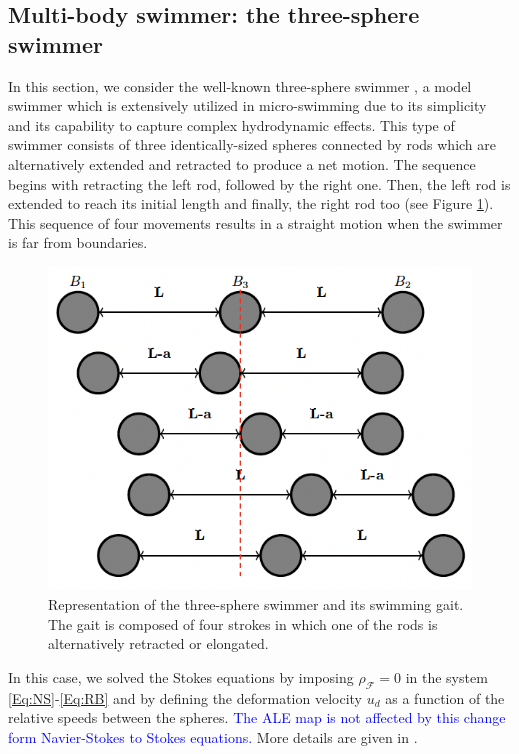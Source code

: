\documentclass[graybox]{svmult}
\newcommand{\review}[1]{\textcolor{blue}{#1}}
\newcommand{\Fluid}{\mathcal{F}} %
\begin{document}
\subsection{Multi-body swimmer: the three-sphere swimmer}

In this section, we consider the well-known three-sphere swimmer \cite{najafi_simplest_2004}, a model swimmer which is extensively utilized in micro-swimming due to its simplicity and its capability to capture complex hydrodynamic effects.
This type of swimmer consists of three identically-sized spheres connected by rods which are alternatively extended and retracted to produce a net motion. The sequence begins with retracting the left rod, followed by the right one. Then, the left rod is extended to reach its initial length and finally, the right rod too (see Figure \ref{Fig:3ss1}). 
This sequence of four movements results in a straight motion when the swimmer is far from boundaries. 

\begin{figure}
	\centering
	\includegraphics[scale=0.55]{Figures/three-sphere/3ss.png}

	\caption{Representation of the three-sphere swimmer and its swimming gait. The gait is composed of four strokes in which one of the rods is alternatively retracted or elongated.}
	\label{Fig:3ss1}
\end{figure}

In this case, we solved the Stokes equations by imposing $\rho_{\Fluid}=0$ in the system \eqref{Eq:NS}-\eqref{Eq:RB} and by defining the deformation velocity $u_d$ as a function of the relative speeds between the spheres. \review{The ALE map is not affected by this change form Navier-Stokes to Stokes equations.} More details are given in \cite{cras2021}. 
\end{document}
